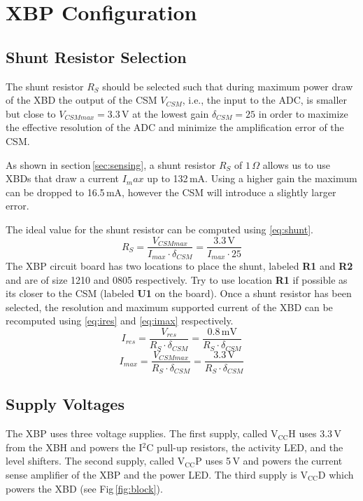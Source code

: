 \documentclass[twoside,11pt]{cergdoc}
\begin{document}
\chapter{XBP Configuration}

\section{Shunt Resistor Selection}
The shunt resistor $R_S$ should be selected such that during maximum power draw of the XBD 
the output of the CSM $V_{CSM}$, i.e., the
input to the ADC,  is smaller but close to $V_{CSMmax}=3.3\,\mathrm{V}$ at 
the lowest gain $\delta_{CSM} = 25$ in order to maximize the effective resolution
of the ADC and minimize the amplification error of the CSM. 

As shown in section\,\ref{sec:sensing}, a shunt resistor $R_S$ of $1\,\Omega$
allows us to use XBDs that draw a current $I_max$ up to 132\,mA. Using a higher 
gain the maximum can be dropped to 16.5\,mA, however the CSM will introduce a 
slightly larger error. 

The ideal value for the shunt resistor can be computed using \eqref{eq:shunt}.
%
\begin{equation}
  R_S = \frac{V_{CSMmax}}{I_{max} \cdot \delta_{CSM}} = \frac{3.3\,\mathrm{V}}{I_{max} \cdot 25}\label{eq:shunt}
\end{equation}
%
The XBP circuit board has two locations to place the shunt, labeled \textbf{R1} 
and \textbf{R2} and are of size 1210 and 0805 respectively. Try to use location 
\textbf{R1} if possible as its closer to the CSM (labeled \textbf{U1} on the board).
Once a shunt resistor has been selected, the resolution and maximum supported current of the XBD can be
recomputed using \eqref{eq:ires} and \eqref{eq:imax} respectively. 
%
\begin{equation}
  I_{res} = \frac{V_{res}}{R_S \cdot \delta_{CSM}} = \frac{0.8\,\mathrm{mV}}{R_S \cdot \delta_{CSM}}\label{eq:ires}
\end{equation}
\begin{equation}
  I_{max} = \frac{V_{CSMmax}}{R_S \cdot \delta_{CSM}} = \frac{3.3\,\mathrm{V}}{R_S \cdot \delta_{CSM}}\label{eq:imax}
\end{equation}

\section{Supply Voltages}
The XBP uses three voltage supplies. The first supply, called $\mathrm{V_{CC}H}$
uses 3.3\,V from the XBH and powers the I$^2$C pull-up resistors, the activity LED, 
and the level shifters.
The second supply, called $\mathrm{V_{CC}P}$ uses 5\,V and powers the current
sense amplifier of the XBP and the power LED. 
The third supply is $\mathrm{V_{CC}D}$ which powers the XBD (see Fig\,\ref{fig:block}).
\end{document}
